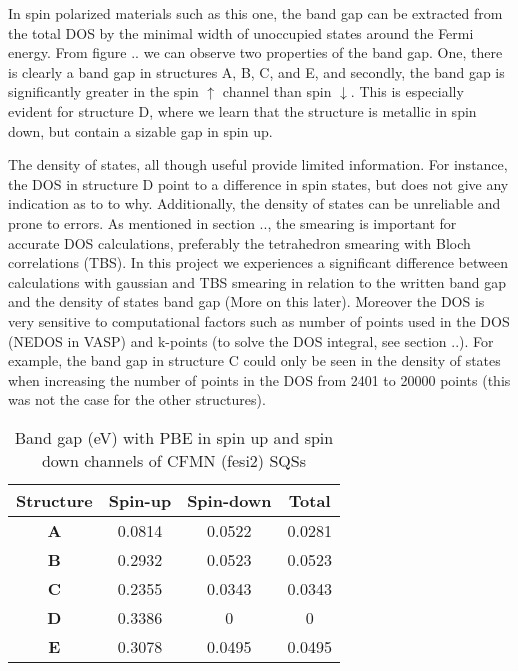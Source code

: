 In spin polarized materials such as this one, the band gap can be extracted from the total DOS by the minimal width of unoccupied states around the Fermi energy. From figure .. we can observe two properties of the band gap. One, there is clearly a band gap in structures A, B, C, and E, and secondly, the band gap is significantly greater in the spin $\uparrow$ channel than spin $\downarrow$. This is especially evident for structure D, where we learn that the structure is metallic in spin down, but contain a sizable  gap in spin up.

The density of states, all though useful provide limited information.  For instance, the DOS in structure D point to a difference in spin states, but does not give any indication as to to why. Additionally, the density of states can be unreliable and prone to errors. As mentioned in section .., the smearing is important for accurate DOS calculations, preferably the tetrahedron smearing with Bloch correlations (TBS). In this project we experiences a significant difference between calculations with gaussian and TBS smearing in relation to the written band gap and the density of states band gap (More on this later). Moreover the DOS is very sensitive to computational factors such as number of points used in the DOS (NEDOS in VASP) and k-points (to solve the DOS integral, see section ..). For example, the band gap in structure C could only be seen in the density of states when increasing the number of points in the DOS from 2401 to 20000 points (this was not the case for the other structures). 

\begin{table}[H]
\centering
\begin{tabular}{@{}cccc@{}}
\toprule
Structure  & Spin-up & Spin-down & Total  \\ \midrule
\textbf{A} & 0.0814  & 0.0522    & 0.0281 \\
\textbf{B} & 0.2932  & 0.0523    & 0.0523 \\
\textbf{C} & 0.2355  & 0.0343    & 0.0343 \\
\textbf{D} & 0.3386  & 0         & 0      \\
\textbf{E} & 0.3078  & 0.0495    & 0.0495 \\ \bottomrule
\end{tabular}
\caption{Band gap (eV) with PBE in spin up and spin down channels of CFMN (fesi2) SQSs}
\end{table}

